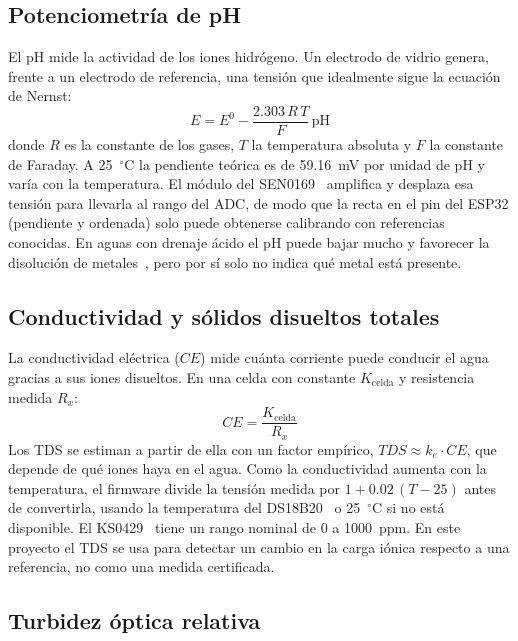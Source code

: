 \subsection{Potenciometría de pH}

El pH mide la actividad de los iones hidrógeno. Un electrodo de vidrio genera, frente a un electrodo de referencia, una tensión que idealmente sigue la ecuación de Nernst:
\begin{equation}
    E = E^0 - \frac{2.303\,R\,T}{F}\,\mathrm{pH}
\end{equation}
donde $R$ es la constante de los gases, $T$ la temperatura absoluta y $F$ la constante de Faraday. A 25~$^{\circ}$C la pendiente teórica es de 59.16~mV por unidad de pH y varía con la temperatura. El módulo del SEN0169~\cite{ph_sen0169} amplifica y desplaza esa tensión para llevarla al rango del ADC, de modo que la recta en el pin del ESP32 (pendiente y ordenada) solo puede obtenerse calibrando con referencias conocidas. En aguas con drenaje ácido el pH puede bajar mucho y favorecer la disolución de metales~\cite{usgsMineDrainage}, pero por sí solo no indica qué metal está presente.

\subsection{Conductividad y sólidos disueltos totales}

La conductividad eléctrica ($CE$) mide cuánta corriente puede conducir el agua gracias a sus iones disueltos. En una celda con constante $K_{\text{celda}}$ y resistencia medida $R_x$:
\begin{equation}
    CE = \frac{K_{\text{celda}}}{R_x}
\end{equation}
Los TDS se estiman a partir de ella con un factor empírico, $TDS \approx k_e \cdot CE$, que depende de qué iones haya en el agua. Como la conductividad aumenta con la temperatura, el firmware divide la tensión medida por $1 + 0.02\,(T - 25)$ antes de convertirla, usando la temperatura del DS18B20~\cite{ds18} o 25~$^{\circ}$C si no está disponible. El KS0429~\cite{tds} tiene un rango nominal de 0 a 1000~ppm. En este proyecto el TDS se usa para detectar un cambio en la carga iónica respecto a una referencia, no como una medida certificada.

\subsection{Turbidez óptica relativa}

